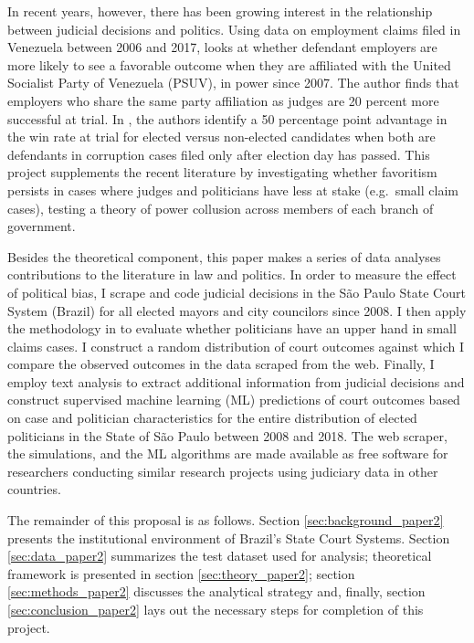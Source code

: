 \documentclass[11pt]{article}
\begin{document}
In recent years, however, there has been growing interest in the relationship between judicial decisions and politics. Using data on employment claims filed in Venezuela between 2006 and 2017, \citet{Sanchez-MartinezDismantlingInstitutionsCourt2018} looks at whether defendant employers are more likely to see a favorable outcome when they are affiliated with the United Socialist Party of Venezuela (PSUV), in power since 2007. The author finds that employers who share the same party affiliation as judges are 20 percent more successful at trial. In \citet{LambaisJudicialSubversionEvidence2018}, the authors identify a 50 percentage point advantage in the win rate at trial for elected versus non-elected candidates when both are defendants in corruption cases filed only after election day has passed. This project supplements the recent literature by investigating whether favoritism persists in cases where judges and politicians have less at stake (e.g.~small claim cases), testing a theory of power collusion across members of each branch of government.

Besides the theoretical component, this paper makes a series of data analyses contributions to the literature in law and politics. In order to measure the effect of political bias, I scrape and code judicial decisions in the São Paulo State Court System (Brazil) for all elected mayors and city councilors since 2008. I then apply the methodology in \citet{AbramsJudgesVaryTheir2012} to evaluate whether politicians have an upper hand in small claims cases. I construct a random distribution of court outcomes against which I compare the observed outcomes in the data scraped from the web. Finally, I employ text analysis to extract additional information from judicial decisions and construct supervised machine learning (ML) predictions of court outcomes based on case and politician characteristics for the entire distribution of elected politicians in the State of São Paulo between 2008 and 2018. The web scraper, the simulations, and the ML algorithms are made available as free software for researchers conducting similar research projects using judiciary data in other countries.

The remainder of this proposal is as follows. Section \ref{sec:background_paper2} presents the institutional environment of Brazil's State Court Systems. Section \ref{sec:data_paper2} summarizes the test dataset used for analysis; theoretical framework is presented in section \ref{sec:theory_paper2}; section \ref{sec:methods_paper2} discusses the analytical strategy and, finally, section \ref{sec:conclusion_paper2} lays out the necessary steps for completion of this project.
\end{document}
